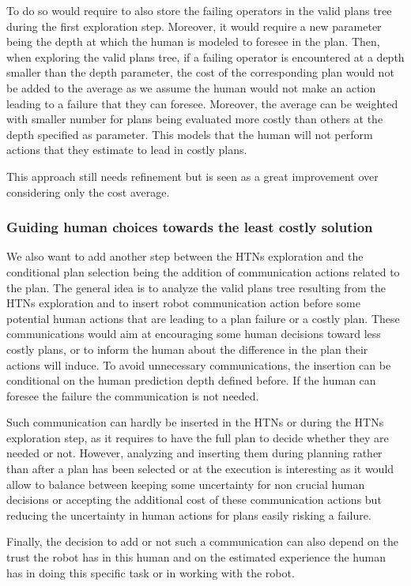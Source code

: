 \documentclass[a4paper,11pt,twoside]{StyleThese}
\begin{document}
To do so would require to also store the failing operators in the valid plans tree during the first exploration step. Moreover, it would require a new parameter being the depth at which the human is modeled to foresee in the plan. Then, when exploring the valid plans tree, if a failing operator is encountered at a depth smaller than the depth parameter, the cost of the corresponding plan would not be added to the average as we assume the human would not make an action leading to a failure that they can foresee. Moreover, the average can be weighted with smaller number for plans being evaluated more costly than others at the depth specified as parameter. This models that the human will not perform actions that they estimate to lead in costly plans.

This approach still needs refinement but is seen as a great improvement over considering only the cost average.

\subsubsection{Guiding human choices towards the least costly solution}
We also want to add another step between the HTNs exploration and the conditional plan selection being the addition of communication actions related to the plan. The general idea is to analyze the valid plans tree resulting from the HTNs exploration and to insert robot communication action before some potential human actions that are leading to a plan failure or a costly plan. These communications would aim at encouraging some human decisions toward less costly plans, or to inform the human about the difference in the plan their actions will induce. To avoid unnecessary communications, the insertion can be conditional on the human prediction depth defined before. If the human can foresee the failure the communication is not needed.

Such communication can hardly be inserted in the HTNs or during the HTNs exploration step, as it requires to have the full plan to decide whether they are needed or not. However, analyzing and inserting them during planning rather than after a plan has been selected or at the execution is interesting as it would allow to balance between keeping some uncertainty for non crucial human decisions or accepting the additional cost of these communication actions but reducing the uncertainty in human actions for plans easily risking a failure.

Finally, the decision to add or not such a communication can also depend on the trust the robot has in this human and on the estimated experience the human has in doing this specific task or in working with the robot.
\end{document}
